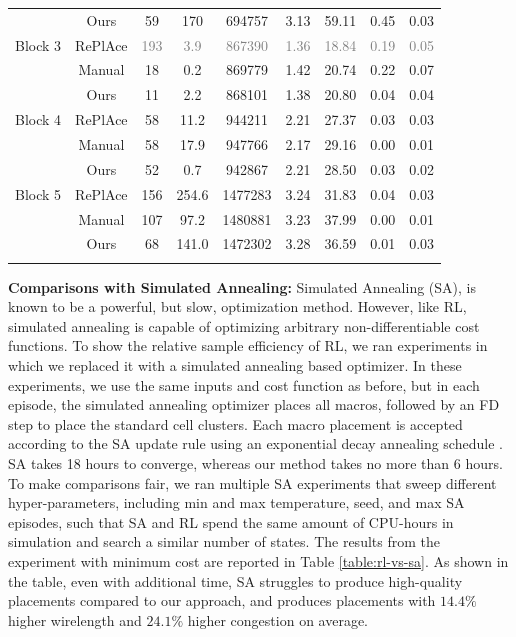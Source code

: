 \documentclass{article}
\begin{document}
\begin{table}[t]
\begin{tabular}{|c|c|c|c|c|c|c|c|c|}
&Ours  	 &	{59} &	170 & {694757} & {3.13} & {59.11} & 0.45 & {0.03}\\ \Xhline{4\arrayrulewidth}
 Block 3 & RePlAce  &  \textcolor{gray}{193} & \textcolor{gray}{3.9}& \textcolor{gray}{867390} & \textcolor{gray}{1.36} &
 \textcolor{gray}{18.84} &
 \textcolor{gray}{0.19} & \textcolor{gray}{0.05}\\ \hline
& Manual  &	18 &	{0.2} & 869779 & 1.42 & 20.74 &	0.22 &	0.07\\ \hline
& Ours &	{11} &	2.2 &  
{868101} &{1.38} & 20.80  & {0.04} & {0.04}  \\ 
\Xhline{4\arrayrulewidth}
Block 4 & RePlAce  & 58 & 11.2 & 944211 & 2.21 & {27.37} & 0.03 & 0.03 \\ \hline
& Manual &	58 & 17.9 & 947766 & {2.17} & 29.16 & {0.00} &{0.01} \\ \hline
& Ours & {52} & {0.7} & {942867} & {2.21} & 28.50 & 0.03 &	0.02  \\ 
\Xhline{4\arrayrulewidth}
 Block 5 & RePlAce &  156 & 254.6 & 1477283 & 3.24 &
 31.83 & 0.04 & 0.03 \\ \hline
& Manual &	107 &	{97.2} & 1480881 & {3.23} & 37.99  &	{0.00} &	{0.01}\\ \hline
& Ours   &	{68} &	141.0 & {1472302} & {3.28} & 36.59 & {0.01} &	0.03	\\ \Xhline{4\arrayrulewidth}
\end{tabular}
\end{table}

\textbf{Comparisons with Simulated Annealing:} Simulated Annealing (SA), is known to be a powerful, but slow, optimization method. However, like RL, simulated annealing is capable of optimizing arbitrary non-differentiable cost functions. To show the relative sample efficiency of RL, we ran experiments in which we replaced it with a simulated annealing based optimizer. In these experiments, we use the same inputs and cost function as before, but in each episode, the simulated annealing optimizer places all macros, followed by an FD step to place the standard cell clusters. Each macro placement is accepted according to the SA update rule using an exponential decay annealing schedule \cite{SimulatedAnnealing}. SA takes 18 hours to converge, whereas our method takes no more than 6 hours. To make comparisons fair, we ran multiple SA experiments that sweep different hyper-parameters, including min and max temperature, seed, and max SA episodes, such that SA and RL spend the same amount of CPU-hours in simulation and search a similar number of states. The results from the experiment with minimum cost are reported in Table \ref{table:rl-vs-sa}. As shown in the table, even with additional time, SA struggles to produce high-quality placements compared to our approach, and produces placements with $14.4\%$ higher wirelength and $24.1\%$ higher congestion on average.
\end{document}
